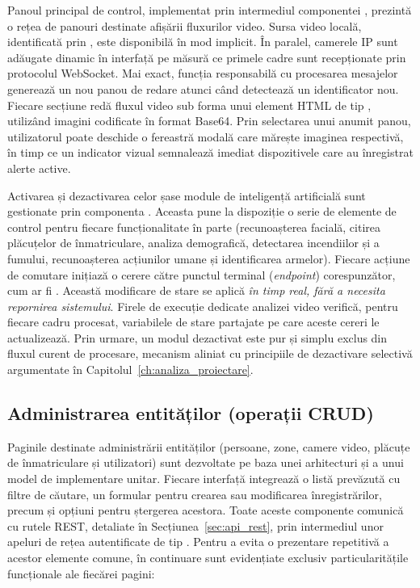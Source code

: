 \documentclass[../../main.tex]{subfiles}
\begin{document}
Panoul principal de control, implementat prin intermediul componentei \linebreak {}, prezintă o rețea de panouri destinate afișării fluxurilor video. Sursa video locală, identificată prin , este disponibilă în mod implicit. În paralel, camerele IP sunt adăugate dinamic în interfață pe măsură ce primele cadre sunt recepționate prin protocolul WebSocket. Mai exact, funcția responsabilă cu procesarea mesajelor generează un nou panou de redare atunci când detectează un identificator  nou. Fiecare secțiune redă fluxul video sub forma unui element HTML de tip , utilizând imagini codificate în format Base64. Prin selectarea unui anumit panou, utilizatorul poate deschide o fereastră modală care mărește imaginea respectivă, în timp ce un indicator vizual semnalează imediat dispozitivele care au înregistrat alerte active.

Activarea și dezactivarea celor șase module de inteligență artificială sunt gestionate prin componenta . Aceasta pune la dispoziție o serie de elemente de control pentru fiecare funcționalitate în parte (recunoașterea facială, citirea plăcuțelor de înmatriculare, analiza demografică, detectarea incendiilor și a fumului, recunoașterea acțiunilor umane și identificarea armelor). Fiecare acțiune de comutare inițiază o cerere către punctul terminal (\emph{endpoint}) corespunzător, cum ar fi . Această modificare de stare se aplică \emph{în timp real, fără a necesita repornirea sistemului}. Firele de execuție dedicate analizei video verifică, pentru fiecare cadru procesat, variabilele de stare partajate pe care aceste cereri le actualizează. Prin urmare, un modul dezactivat este pur și simplu exclus din fluxul curent de procesare, mecanism aliniat cu principiile de dezactivare selectivă argumentate în Capitolul~\ref{ch:analiza_proiectare}.

\subsection{Administrarea entităților (operații CRUD)}

Paginile destinate administrării entităților (persoane, zone, camere video, plăcuțe de înmatriculare și utilizatori) sunt dezvoltate pe baza unei arhitecturi și a unui model de implementare unitar. Fiecare interfață integrează o listă prevăzută cu filtre de căutare, un formular pentru crearea sau modificarea înregistrărilor, precum și opțiuni pentru ștergerea acestora. Toate aceste componente comunică cu rutele REST, detaliate în Secțiunea~\ref{sec:api_rest}, prin intermediul unor apeluri de rețea autentificate de tip . Pentru a evita o prezentare repetitivă a acestor elemente comune, în continuare sunt evidențiate exclusiv particularitățile funcționale ale fiecărei pagini:
\end{document}
